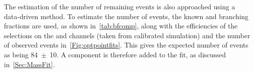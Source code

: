 




The estimation of the number of remaining \LbKjpsi events is also approached using a data-driven method. To estimate the number of \LbKjpsi events, the known \LbKjpsi and \Lbpijpsi branching fractions are used, as shown in~\autoref{tab:bfcomp}, along with the efficiencies of the \dllkpi selections on the \LbKjpsi and \Lbpijpsi channels (taken from calibrated simulation) and the number of observed \Lbpijpsi events in~\autoref{Fig:optpointfits}. This gives the expected number of \LbKjpsi events as being 84~$\pm$~10. A \LbKjpsi component is therefore added to the \Lbpijpsi fit, as discussed in~\autoref{Sec:MassFit}. %




